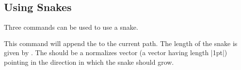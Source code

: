 \subsection{Using Snakes}

Three commands can be used to use a snake.

\begin{command}{\pgfpathsnakealongvector{}}
  This command will append the  to the current path. The
  length of the snake is given by . The 
  should be a normalizes vector (a vector having length |1pt|)
  pointing in the direction in which the snake should grow.
\begin{codeexample}[]
\end{codeexample}
\end{command}


